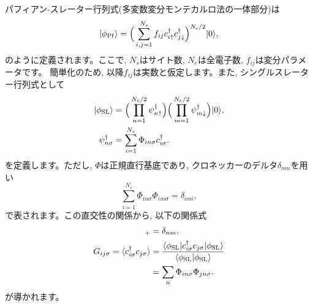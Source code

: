 パフィアン-スレーター行列式(多変数変分モンテカルロ法の一体部分)は
\begin{equation}
|\phi_{\rm Pf}\rangle=\Big(\sum_{i,j=1}^{N_{s}}f_{ij}c_{i\uparrow}^{\dagger}c_{j\downarrow}^{\dagger}\Big)^{N_{\rm e}/2}|0\rangle,
\end{equation}
のように定義されます。ここで, $N_{s}$はサイト数, $N_{e}$は全電子数, $f_{ij}$は変分パラメータです。
簡単化のため, 以降$f_{ij}$は実数と仮定します。また, シングルスレーター行列式として
\begin{align}
|\phi_{\rm SL}\rangle&=\Big(\prod_{n=1}^{N_{e}/2}\psi_{n\uparrow}^{\dagger}\Big)
\Big(\prod_{m=1}^{N_{e}/2}\psi_{m\downarrow}^{\dagger}\Big)|0\rangle, \\
\psi_{n\sigma}^{\dagger}&=\sum_{i=1}^{N_{s}}\Phi_{in\sigma}c^{\dagger}_{i\sigma}.
\end{align}
を定義します。ただし, $\Phi$は正規直行基底であり, クロネッカーのデルタ$\delta_{nm}$を用い
\begin{equation}
\sum_{i=1}^{N_{s}}\Phi_{in\sigma}\Phi_{im\sigma}=\delta_{nm},
\end{equation}
で表されます。この直交性の関係から, 以下の関係式
\begin{align}
[\psi^{\dagger}_{n\sigma},\psi_{m\sigma}]_{+}&=\delta_{nm},\\
G_{ij\sigma}=\langle c_{i\sigma}^{\dagger}c_{j\sigma}\rangle 
&=\frac{\langle \phi_{\rm SL}| c_{i\sigma}^{\dagger}c_{j\sigma} | \phi_{\rm SL}\rangle}{\langle \phi_{\rm SL}|\phi_{\rm SL}\rangle } \\
&=\sum_{n} \Phi_{in\sigma} \Phi_{jn\sigma}.
\end{align}
が導かれます。

